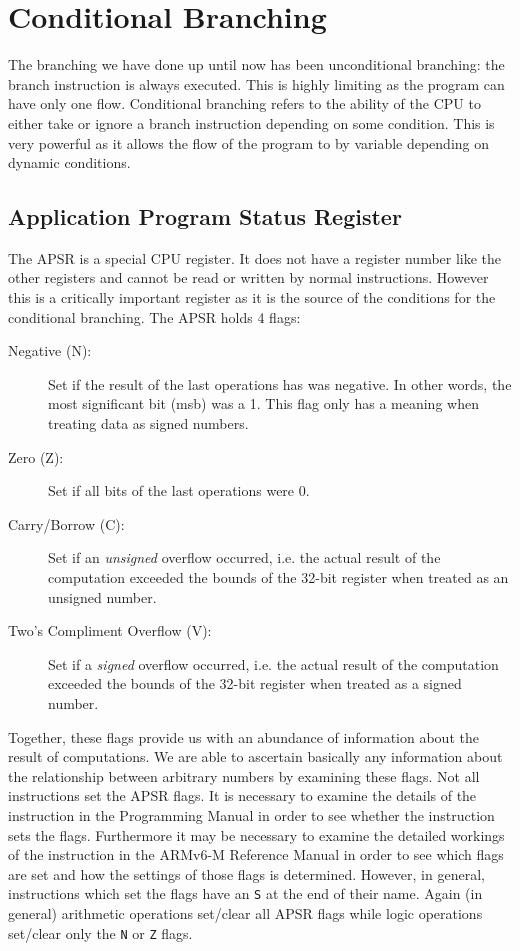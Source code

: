 \chapter{Conditional Branching}
The branching we have done up until now has been unconditional branching: the branch instruction is always executed. This is highly limiting as the program can have only one flow. Conditional branching refers to the ability of the CPU to either take or ignore a branch instruction depending on some condition. This is very powerful as it allows the flow of the program to by variable depending on dynamic conditions. 

\section{Application Program Status Register}
The APSR is a special CPU register. It does not have a register number like the other registers and cannot be read or written by normal instructions. However this is a critically important register as it is the source of the conditions for the conditional branching. The APSR holds 4 flags:
\begin{description}
\item[Negative (N):] Set if the result of the last operations has was negative. In other words, the most significant bit (msb) was a 1. This flag only has a meaning when treating data as signed numbers. 
\item[Zero (Z):] Set if all bits of the last operations were 0.
\item[Carry/Borrow (C):] Set if an \emph{unsigned} overflow occurred, i.e. the actual result of the computation exceeded the bounds of the 32-bit register when treated as an unsigned number.
\item[Two's Compliment Overflow (V):] Set if a \emph{signed} overflow occurred, i.e. the actual result of the computation exceeded the bounds of the 32-bit register when treated as a signed number. 
\end{description}

Together, these flags provide us with an abundance of information about the result of computations. We are able to ascertain basically any information about the relationship between arbitrary numbers by examining these flags. Not all instructions set the APSR flags. It is necessary to examine the details of the instruction in the Programming Manual in order to see whether the instruction sets the flags. Furthermore it may be necessary to examine the detailed workings of the instruction in the ARMv6-M Reference Manual in order to see which flags are set and how the settings of those flags is determined. However, in general, instructions which set the flags have an \texttt{S} at the end of their name. Again (in general) arithmetic operations set/clear all APSR flags while logic operations set/clear only the \texttt{N} or \texttt{Z} flags. 

